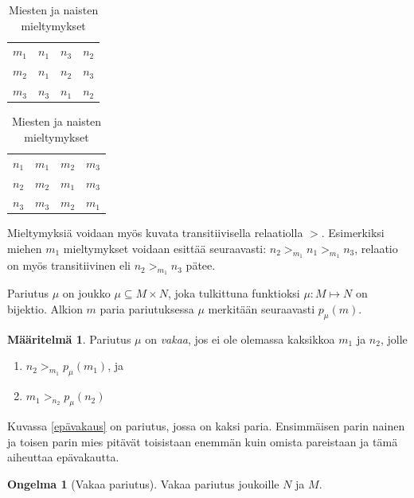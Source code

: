 \documentclass[finnish]{tktltiki2}
\theoremstyle{definition}
\newtheorem{maar}[lau]{Määritelmä}
\newtheorem{ong}{Ongelma}
\theoremstyle{remark}
\begin{document}
\begin{table}[b]
\centering
	\begin{tabular}{ l | *{2}{c} r }
	 &  \\
	 \hline
 	 $m_{1}$ & $n_{1}$ & $n_{3}$ & $n_{2}$ \\
 	 $m_{2}$ & $n_{1}$ & $n_{2}$ & $n_{3}$ \\
 	 $m_{3}$ & $n_{3}$ & $n_{1}$ & $n_{2}$ \\
	\end{tabular}
	\quad
	\begin{tabular}{ l | *{2}{c} r }
	 &  \\
	 \hline
 	 $n_{1}$ & $m_{1}$ & $m_{2}$ & $m_{3}$ \\
 	 $n_{2}$ & $m_{2}$ & $m_{1}$ & $m_{3}$ \\
 	 $n_{3}$ & $m_{3}$ & $m_{2}$ & $m_{1}$ \\
	\end{tabular}
	\caption{Miesten ja naisten mieltymykset}
	\label{mieltymyksettaul}
\end{table}

Mieltymyksiä voidaan myös kuvata transitiivisella relaatiolla $>$. Esimerkiksi miehen $m_1$ mieltymykset voidaan esittää seuraavasti: $n_2 >_{m_1} n_1 >_{m_1} n_3$, relaatio on myös transitiivinen eli $n_2 >_{m_1} n_3$ pätee.

Pariutus $\mu$ on joukko $\mu \subseteq M \times N$, joka tulkittuna funktioksi $\mu : M \mapsto N$ on bijektio. Alkion $m$ paria pariutuksessa $\mu$ merkitään seuraavasti $p_{\mu}(m)$.

\begin{maar}
Pariutus $\mu$ on \emph{vakaa}, jos ei ole olemassa kaksikkoa $m_1$ ja  $n_2$, jolle
\begin{enumerate}
	\item $n_2 >_{m_{1}} p_{\mu}(m_1)$, ja
	\item $m_1 >_{n_{2}} p_{\mu}(n_2)$
\end{enumerate}


Kuvassa \ref{epävakaus} on pariutus, jossa on kaksi paria. Ensimmäisen parin nainen ja toisen parin mies pitävät toisistaan enemmän kuin omista pareistaan ja tämä aiheuttaa epävakautta.

\begin{ong}[Vakaa pariutus]
Vakaa pariutus joukoille $N$ ja $M$.
\end{ong}
\end{maar}
\end{document}
